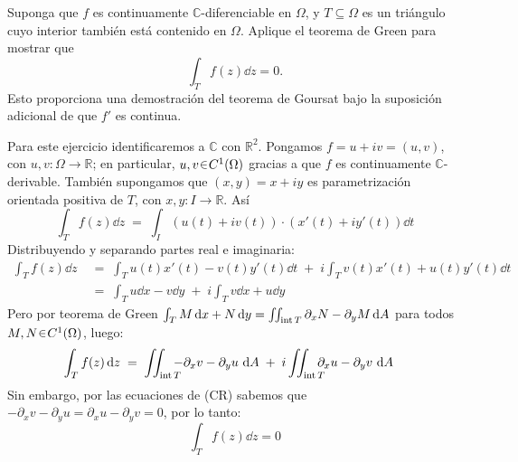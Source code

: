 \setcounter{eje}{4}
\begin{ejer}
Suponga que $f$ es continuamente $\mathbb{C}$-diferenciable en $\Omega$, y $T \subseteq \Omega$ es un triángulo cuyo interior también está contenido en $\Omega$. Aplique el teorema de Green para mostrar que
\[ \int_T f(z) \dd{z} = 0. \]
Esto proporciona una demostración del teorema de Goursat bajo la suposición adicional de que $f'$ es continua.
\end{ejer}
\begin{sol}
Para este ejercicio identificaremos a $\mathbb{C}$ con $\mathbb{R}^2$. Pongamos $f=u+iv=(u,v)$, con $u,v\colon\Omega \to \mathbb{R}$; en particular, $u,v\en C^1(\Omega)$ gracias a que $f$ es continuamente $\mathbb{C}$-derivable. También supongamos que $(x,y) = x+iy$ es parametrización orientada positiva de $T$, con $x,y\colon I \to \mathbb{R}$. Así
\[
\int_T f(z) \dd{z}
\;=\; \int_I (u(t)+iv(t))\cdot(x'(t)+iy'(t)) \dd{t}
\]
Distribuyendo y separando partes real e imaginaria:
\begin{align*}
\int_T f(z) \dd{z}
&\;=\; \int_T u(t)x'(t) - v(t)y'(t) \dd{t}  \;+\;  i\int_T v(t)x'(t) + u(t)y'(t) \dd{t}\\
&\;=\; \int_T u\dd{x} - v\dd{y}  \;+\;  i\int_T v\dd{x} + u\dd{y}
\end{align*}
Pero por teorema de Green $\int_T M\dd{x} + N\dd{y} = \iint_{\operatorname{int} T} \partial_x N- \partial_y M \dd{A}$ para todos $M,N\en C^1(\Omega)$, luego:
\begin{align*}
\int_T f(z) \dd{z}
&\;=\; \iint_{\operatorname{int} T\hspace{-0.8em}} {-\partial_xv - \partial_yu} \,\dd{A}  \;+\;  i \iint_{\operatorname{int} T\hspace{-0.8em}} {\partial_xu - \partial_yv} \,\dd{A}
\end{align*}
Sin embargo, por las ecuaciones de (CR) sabemos que ${-\partial_xv - \partial_yu} = {\partial_xu - \partial_yv} = 0$, por lo tanto:
\[
\int_T f(z) \dd{z} = 0
\]
\end{sol}